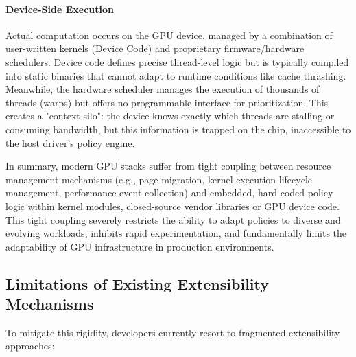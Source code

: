 \paragraph{Device-Side Execution}
Actual computation occurs on the GPU device, managed by a combination of user-written kernels (Device Code) and proprietary firmware/hardware schedulers. Device code defines precise thread-level logic but is typically compiled into static binaries that cannot adapt to runtime conditions like cache thrashing. Meanwhile, the hardware scheduler manages the execution of thousands of threads (warps) but offers no programmable interface for prioritization. This creates a "context silo": the device knows exactly which threads are stalling or consuming bandwidth, but this information is trapped on the chip, inaccessible to the host driver's policy engine.


In summary, modern GPU stacks suffer from tight coupling between resource management mechanisms (e.g.,  page migration, kernel execution lifecycle management, performance event collection) and embedded, hard-coded policy logic within kernel modules, closed-source vendor libraries or GPU device code. This tight coupling severely restricts the ability to adapt policies to diverse and evolving workloads, inhibits rapid experimentation, and fundamentally limits the adaptability of GPU infrastructure in production environments.

\subsection{Limitations of Existing Extensibility Mechanisms}


To mitigate this rigidity, developers currently resort to fragmented extensibility approaches:

